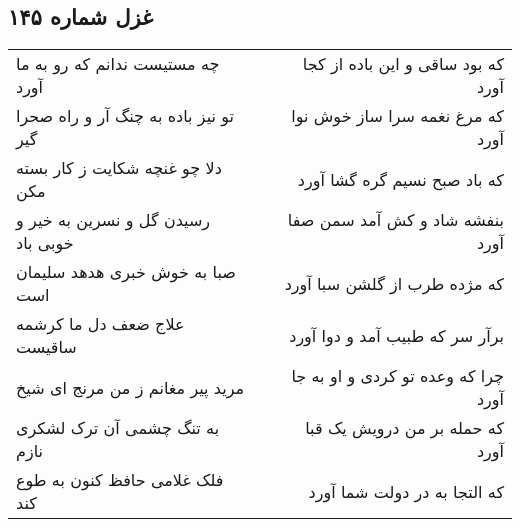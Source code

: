 \begin{center}
\section*{غزل شماره ۱۴۵}
\label{sec:sh145}
\begin{longtable}{l p{0.5cm} r}
چه مستیست ندانم که رو به ما آورد
&&
که بود ساقی و این باده از کجا آورد
\\
تو نیز باده به چنگ آر و راه صحرا گیر
&&
که مرغ نغمه سرا ساز خوش نوا آورد
\\
دلا چو غنچه شکایت ز کار بسته مکن
&&
که باد صبح نسیم گره گشا آورد
\\
رسیدن گل و نسرین به خیر و خوبی باد
&&
بنفشه شاد و کش آمد سمن صفا آورد
\\
صبا به خوش خبری هدهد سلیمان است
&&
که مژده طرب از گلشن سبا آورد
\\
علاج ضعف دل ما کرشمه ساقیست
&&
برآر سر که طبیب آمد و دوا آورد
\\
مرید پیر مغانم ز من مرنج ای شیخ
&&
چرا که وعده تو کردی و او به جا آورد
\\
به تنگ چشمی آن ترک لشکری نازم
&&
که حمله بر من درویش یک قبا آورد
\\
فلک غلامی حافظ کنون به طوع کند
&&
که التجا به در دولت شما آورد
\\
\end{longtable}
\end{center}
